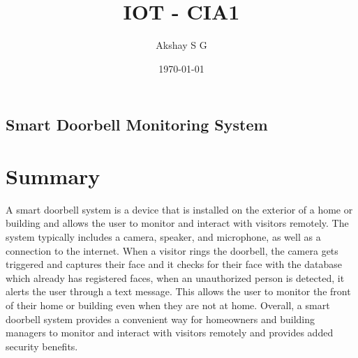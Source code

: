\documentclass{report}
\title{IOT - CIA1}
\author{Akshay S G}
\date{\today}
\begin{document}
    
    
    \begin{center}
        \section*{Smart Doorbell Monitoring System}
    \end{center}
\setlength{\columnsep}{1.0cm}
    \large
    \section{Summary}
    A smart doorbell system is a device that is installed on the exterior of a home or building and allows the user to monitor and interact with visitors remotely. The system typically includes a camera, speaker, and microphone, as well as a connection to the internet. When a visitor rings the doorbell, the camera gets triggered and captures their face and it checks for their face with the database which already has registered faces, when an unauthorized person is detected, it alerts the user through a text message. This allows the user to monitor the front of their home or building even when they are not at home. Overall, a smart doorbell system provides a convenient way for homeowners and building managers to monitor and interact with visitors remotely and provides added security benefits.
\end{document}
